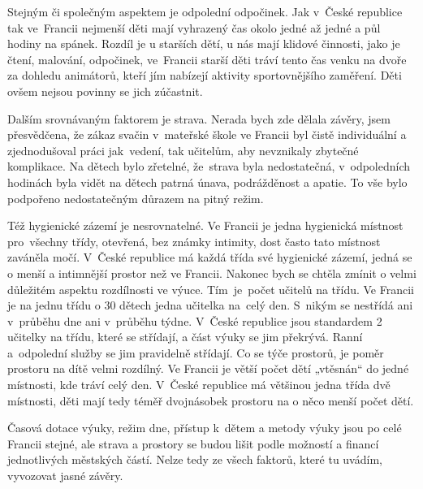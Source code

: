 		Stejným či společným aspektem je odpolední odpočinek. Jak v České republice tak ve Francii nejmenší děti mají vyhrazený čas okolo jedné až jedné a půl hodiny na spánek. Rozdíl je u starších dětí, u nás mají klidové činnosti, jako je čtení, malování, odpočinek, ve Francii starší děti tráví tento čas venku na dvoře za dohledu animátorů, kteří jím nabízejí aktivity sportovnějšího zaměření. Děti ovšem nejsou povinny se jich zúčastnit.

		Dalším srovnávaným faktorem je strava. Nerada bych zde dělala závěry, jsem přesvědčena, že zákaz svačin v mateřské škole ve Francii byl čistě individuální a zjednodušoval práci jak vedení, tak učitelům, aby nevznikaly zbytečné komplikace. Na dětech bylo zřetelné, že strava byla nedostatečná, v odpoledních hodinách byla vidět na dětech patrná únava, podrážděnost a apatie. To vše bylo podpořeno nedostatečným důrazem na pitný režim.

		Též hygienické zázemí je nesrovnatelné. Ve Francii je jedna hygienická místnost pro všechny třídy, otevřená, bez známky intimity, dost často tato místnost zaváněla močí. V České republice má každá třída své hygienické zázemí, jedná se o menší a intimnější prostor než ve Francii.
		Nakonec bych se chtěla zmínit o velmi důležitém aspektu rozdílnosti ve výuce. Tím je počet učitelů na třídu. Ve Francii je na jednu třídu o 30 dětech jedna učitelka na celý den. S nikým se nestřídá ani v průběhu dne ani v průběhu týdne. V České republice jsou standardem 2 učitelky na třídu, které se střídají, a část výuky se jim překrývá. Ranní a odpolední služby se jim pravidelně střídají. Co se týče prostorů, je poměr prostoru na dítě velmi rozdílný. Ve Francii je větší počet dětí „vtěsnán“ do jedné místnosti, kde tráví celý den. V České republice má většinou jedna třída dvě místnosti, děti mají tedy téměř dvojnásobek prostoru na o něco menší počet dětí.

		
		Časová dotace výuky, režim dne, přístup k dětem a metody výuky jsou po celé Francii stejné, ale strava a prostory se budou lišit podle možností a financí jednotlivých městských částí. Nelze tedy ze všech faktorů, které tu uvádím, vyvozovat jasné závěry.
